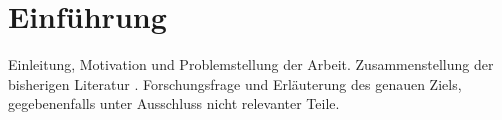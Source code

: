 \chapter{Einführung}\label{ch:1}
Einleitung, Motivation und Problemstellung der Arbeit. Zusammenstellung der bisherigen Literatur \autocite{lorenz1963deterministic}. Forschungsfrage und Erläuterung des genauen Ziels, gegebenenfalls unter Ausschluss nicht relevanter Teile.
